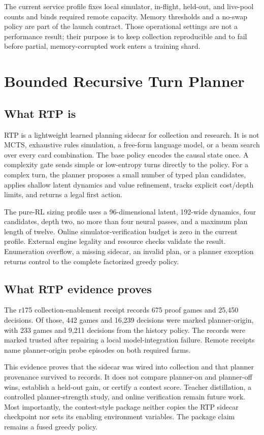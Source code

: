 \documentclass[10pt]{article}
\begin{document}
The current service profile fixes local simulator, in-flight, held-out, and live-pool counts and binds required remote capacity. Memory thresholds and a no-swap policy are part of the launch contract. Those operational settings are not a performance result; their purpose is to keep collection reproducible and to fail before partial, memory-corrupted work enters a training shard.

\section{Bounded Recursive Turn Planner}

\subsection{What RTP is}

RTP is a lightweight learned planning sidecar for collection and research. It is not MCTS, exhaustive rules simulation, a free-form language model, or a beam search over every card combination. The base policy encodes the causal state once. A complexity gate sends simple or low-entropy turns directly to the policy. For a complex turn, the planner proposes a small number of typed plan candidates, applies shallow latent dynamics and value refinement, tracks explicit cost/depth limits, and returns a legal first action.

The pure-RL sizing profile uses a 96-dimensional latent, 192-wide dynamics, four candidates, depth two, no more than four neural passes, and a maximum plan length of twelve. Online simulator-verification budget is zero in the current profile. External engine legality and resource checks validate the result. Enumeration overflow, a missing sidecar, an invalid plan, or a planner exception returns control to the complete factorized greedy policy.

\subsection{What RTP evidence proves}

The r175 collection-enablement receipt records 675 proof games and 25,450 decisions. Of those, 442 games and 16,239 decisions were marked planner-origin, with 233 games and 9,211 decisions from the history policy. The records were marked trusted after repairing a local model-integration failure. Remote receipts name planner-origin probe episodes on both required farms.

This evidence proves that the sidecar was wired into collection and that planner provenance survived to records. It does not compare planner-on and planner-off wins, establish a held-out gain, or certify a contest score. Teacher distillation, a controlled planner-strength study, and online verification remain future work. Most importantly, the contest-style package neither copies the RTP sidecar checkpoint nor sets its enabling environment variables. The package claim remains a fused greedy policy.
\end{document}
